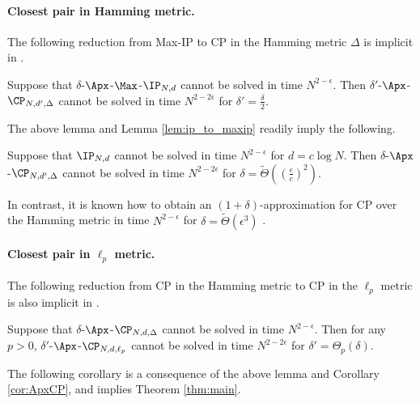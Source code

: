 \documentclass[11pt]{article}
\begin{document}
\paragraph{Closest pair in Hamming metric.}

The following reduction from Max-IP to CP in the  Hamming metric $\Delta$ is implicit in \cite{Rub18}.

\begin{lem}\label{lem:maxip_to_hamming}
Suppose that $\delta$-$\Apx$-$\Max$-$\IP_{N,d}$ cannot be solved in time $N^{2-\epsilon}$. Then 
$\delta'$-$\Apx$-$\CP_{N,d',\Delta}$ cannot be solved in time $N^{2-2\epsilon}$ for 
$\delta' = \frac \delta 2$. 
\end{lem}

The above lemma and Lemma  \ref{lem:ip_to_maxip} readily imply the following.

\begin{cor}\label{cor:ApxCP}
Suppose that $\IP_{N,d}$ cannot be solved in time $N^{2-\epsilon}$ for $d = c \log N$. Then $\delta$-$\Apx$-$\CP_{N,d',\Delta}$ cannot be solved in time $N^{2-2\epsilon}$ for 
$\delta = \tilde \Theta( ( \frac \epsilon c)^2) $.
\end{cor}


In contrast, it is known how to obtain an $(1+\delta)$-approximation for CP over the Hamming metric in time $N^{2-\epsilon}$ for $\delta = \tilde \Theta( \epsilon^{3})$ \cite{ACW16}.

\paragraph{Closest pair in $\ell_p$ metric.}

The following reduction from CP in the Hamming metric to CP in the  $\ell_p$ metric  is also implicit in \cite{Rub18}.

\begin{lem} \label{lem:hamtolp}
    Suppose that $\delta$-$\Apx$-$\CP_{N, d, \Delta}$ cannot be solved in time $N^{2-\epsilon}$. Then for any $p>0$, $\delta'$-$\Apx$-$\CP_{N,d,\ell_p}$ cannot be solved in time $N^{2-2\epsilon}$ for $\delta' = \Theta_p(\delta)$.
\end{lem}

The following corollary is a consequence of the above lemma and Corollary \ref{cor:ApxCP}, and implies Theorem \ref{thm:main}.
\end{document}
